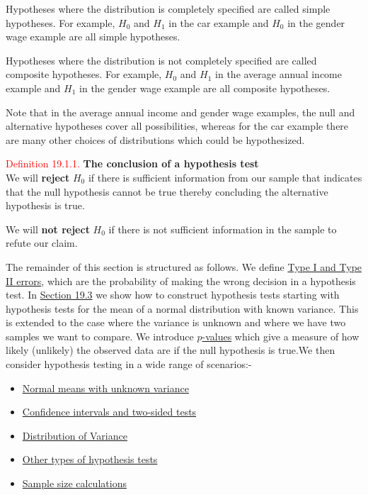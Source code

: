 \documentclass[
]{book}
\providecommand{\tightlist}{%
  \setlength{\itemsep}{0pt}\setlength{\parskip}{0pt}}
\begin{document}
Hypotheses where the distribution is completely specified are called simple hypotheses. For example, \(H_0\) and \(H_1\) in the car example and \(H_0\) in the gender wage example are all simple hypotheses.

Hypotheses where the distribution is not completely specified are called composite hypotheses. For example, \(H_0\) and \(H_1\) in the average annual income example and \(H_1\) in the gender wage example are all composite hypotheses.

Note that in the average annual income and gender wage examples, the null and alternative hypotheses cover all possibilities, whereas for the car example there are many other choices of distributions which could be hypothesized.

\leavevmode{}%
\textcolor{red}{Definition 19.1.1.}
{\textbf{The conclusion of a hypothesis test}}\\
We will \textbf{reject} \(H_0\) if there is sufficient information from our sample that indicates that the null hypothesis cannot be true thereby concluding the alternative hypothesis is true.

We will \textbf{not reject} \(H_0\) if there is not sufficient information in the sample to refute our claim.

The remainder of this section is structured as follows. We define \protect\hyperlink{Sec_Hypo_Test:errors}{Type I and Type II errors}, which are the probability of making the wrong decision in a hypothesis test. In \href{\%7B\#Sec_Hypo_Test:normal_known\%7D}{Section 19.3} we show how to construct hypothesis tests starting with hypothesis tests for the mean of a normal distribution with known variance. This is extended to the case where the variance is unknown and where we have two samples we want to compare. We introduce \protect\hyperlink{Sec_Hypo_Test:p_values}{\(p\)-values} which give a measure of how likely (unlikely) the observed data are if the null hypothesis is true.We then consider hypothesis testing in a wide range of scenarios:-

\begin{itemize}
\tightlist
\item
  \protect\hyperlink{Sec_Hypo_Test:normal_unknown}{Normal means with unknown variance}
\item
  \protect\hyperlink{Sec_Hypo_Test:twosided}{Confidence intervals and two-sided tests}
\item
  \protect\hyperlink{Sec_Hypo_Test:variance}{Distribution of Variance}\\
\item
  \protect\hyperlink{Sec_Hypo_Test:other}{Other types of hypothesis tests}\\
\item
  \protect\hyperlink{Sec_Hypo_Test:samplesize}{Sample size calculations}
\end{itemize}
\end{document}
